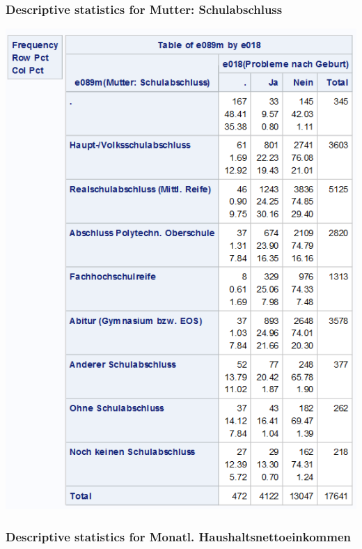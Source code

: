 \documentclass[
  10pt,
]{article}
\begin{document}
\hypertarget{descriptive-statistics-for-mutter-schulabschluss}{%
\subsubsection{Descriptive statistics for Mutter:
Schulabschluss}\label{descriptive-statistics-for-mutter-schulabschluss}}

\includegraphics[width=7.71in]{./Yimeng_Plots/M7_0c}

\hypertarget{descriptive-statistics-for-monatl.-haushaltsnettoeinkommen}{%
\subsubsection{Descriptive statistics for Monatl.
Haushaltsnettoeinkommen}\label{descriptive-statistics-for-monatl.-haushaltsnettoeinkommen}}
\end{document}
